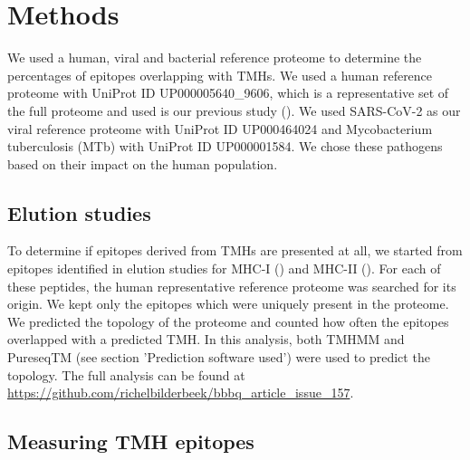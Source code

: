 \section{Methods}


We used a human, viral and bacterial reference proteome to 
determine the percentages of epitopes overlapping
with TMHs.
We used a human reference proteome
with UniProt ID UP000005640\_9606, which
is a representative set of the full proteome
and used is our previous study (\cite{bianchi2017}).
We used SARS-CoV-2 as our viral reference proteome
with UniProt ID UP000464024 and
Mycobacterium tuberculosis (MTb) 
with UniProt ID UP000001584.
We chose these pathogens based on their impact on the human population.

\subsection{Elution studies}\label{subsec:elution_studies}

To determine if epitopes derived from TMHs are presented at all,
we started from epitopes identified in elution studies
for MHC-I (\cite{schellens2015comprehensive}) 
and MHC-II (\cite{bergseng2015different}).
For each of these peptides, the human representative reference proteome
was searched for its origin.
We kept only the epitopes which were uniquely present
in the proteome.
We predicted the topology of the proteome
and counted how often the epitopes overlapped
with a predicted TMH.
In this analysis, both TMHMM and 
PureseqTM (see section 'Prediction software used') 
were used to predict the topology.
The full analysis can be found
at \url{https://github.com/richelbilderbeek/bbbq_article_issue_157}.

\subsection{Measuring TMH epitopes}

